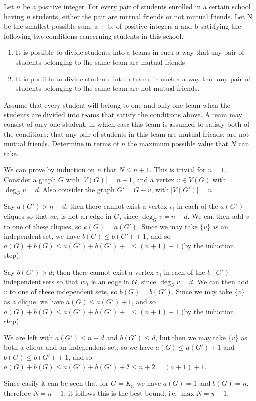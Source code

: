 \documentclass{subfile}
\begin{document}
		\begin{problem}
			Let $n$ be a positive integer. For every pair of students enrolled in a certain school having $n$ students, either the pair are mutual friends or not mutual friends. Let N be the smallest possible sum, a + b, of positive integers a and b satisfying the following two conditions concerning students in this school.
			\begin{enumerate}
				\item It is possible to divide students into a teams in such a way that any pair of students belonging to the same team are mutual friends
				\item It is possible to divide students into b teams in such a a way that any pair of students belonging to the same team are not mutual friends.
			\end{enumerate}
			Assume that every student will belong to one and only one team when the students are divided into teams that satisfy the conditions above. A team may consist of only one student, in which case this team is assumed to satisfy both of the conditions: that any pair of students in this team are mutual friends; are not mutual friends. Determine in terms of $n$ the maximum
			possible value that $N$ can take.
		\end{problem}
		
		\begin{solution}
		    We can prove by induction on $n$ that $N\leq n+1$. This is trivial for $n=1$. Consider a graph $G$ with $|V(G)|=n+1$, and a vertex $v\in V(G)$ with $\deg_G v = d$. Also consider the graph $G'= G - v$, with $|V(G')|=n$.

            Say $a(G')>n-d$; then there cannot exist a vertex $v_i$ in each of the $a(G')$ cliques so that $vv_i$ is not an edge in $G$, since $\deg_{\overline{G}} v = n-d$. We can then add $v$ to one of these cliques, so $a(G) = a(G')$. Since we may take $\{v\}$ as an independent set, we have $b(G) \leq b(G') + 1$, and so $a(G) + b(G) \leq a(G') + b(G') + 1 \leq (n+1) + 1$ (by the induction step).
            
            Say $b(G')>d$; then there cannot exist a vertex $v_i$ in each of the $b(G')$ independent sets so that $vv_i$ is an edge in $G$, since $\deg_G v = d$. We can then add $v$ to one of these independent sets, so $b(G) = b(G')$. Since we may take $\{v\}$ as a clique, we have $a(G) \leq a(G') + 1$, and so $a(G) + b(G) \leq a(G') + b(G') + 1 \leq (n+1) + 1$ (by the induction step).
            
            We are left with $a(G')\leq n-d$ and $b(G')\leq d$, but then we may take $\{v\}$ as both a clique and an independent set, so we have $a(G) \leq a(G') + 1$ and $b(G) \leq b(G') + 1$, and so $a(G) + b(G) \leq a(G') + b(G') + 2 \leq n + 2 = (n+1) + 1$.
            
            Since easily it can be seen that for $G=K_n$ we have $a(G)=1$ and $b(G)=n$, therefore $N=n+1$, it follows this is the best bound, i.e. $\max N = n+1$.
        \end{solution}
\end{document}
